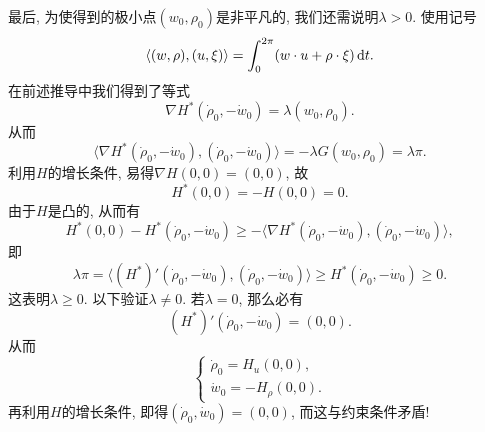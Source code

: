 \documentclass[12pt,a4paper]{article}
\begin{document}
最后, 为使得到的极小点$(w_0, \rho_0)$是非平凡的, 我们还需说明$\lambda > 0$.
使用记号 
\begin{equation*}
    \langle (w, \rho), (u, \xi)\rangle = \int_0^{2\pi}(w \cdot u + \rho \cdot \xi) \,{\rm d}t.
\end{equation*}
在前述推导中我们得到了等式 
\begin{equation*}
    \nabla H^*(\dot \rho_0, -\dot w_0) = \lambda(w_0, \rho_0).
\end{equation*}
从而 
\begin{equation*}
    \langle \nabla H^*(\dot \rho_0, -\dot w_0), (\dot\rho_0, -\dot w_0)\rangle = -\lambda G(w_0, \rho_0) = \lambda\pi.
\end{equation*}
利用$H$的增长条件, 易得$\nabla H(0, 0) = (0, 0)$, 故 
\begin{equation*}
    H^*(0, 0) = -H(0, 0) = 0.
\end{equation*}
由于$H$是凸的, 从而有 
\begin{equation*}
    H^*(0, 0) - H^*(\dot\rho_0, -\dot w_0) \geq -\langle \nabla H^*(\dot\rho_0, -\dot w_0), (\dot \rho_0, -\dot w_0)\rangle,
\end{equation*}
即 
\begin{equation*}
    \lambda\pi = \langle (H^*)'(\dot\rho_0, -\dot w_0), (\dot \rho_0, -\dot w_0)\rangle \geq H^*(\dot\rho_0, -\dot w_0) \geq 0.
\end{equation*}
这表明$\lambda \geq 0$. 以下验证$\lambda \neq 0$. 若$\lambda = 0$, 那么必有 
\begin{equation*}
    (H^*)'(\dot\rho_0, -\dot w_0) = (0, 0).
\end{equation*}
从而 
\begin{equation*}
    \begin{cases}
        \dot\rho_0 = H_u(0, 0), \\ 
        \dot w_0 = -H_{\rho}(0, 0).
    \end{cases}
\end{equation*}
再利用$H$的增长条件, 即得$(\dot\rho_0, \dot w_0) = (0, 0)$, 而这与约束条件矛盾!
\end{document}
